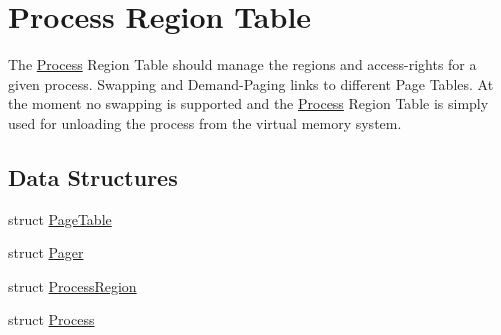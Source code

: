 \hypertarget{group___v_m_m___p_r_t}{
\section{Process Region Table}
\label{group___v_m_m___p_r_t}
}
The \hyperlink{struct_process}{Process} Region Table should manage the regions and access-rights for a given process. Swapping and Demand-Paging links to different Page Tables. At the moment no swapping is supported and the \hyperlink{struct_process}{Process} Region Table is simply used for unloading the process from the virtual memory system.  


\subsection*{Data Structures}
\begin{CompactItemize}
\item 
struct \hyperlink{struct_page_table}{PageTable}
\item 
struct \hyperlink{struct_pager}{Pager}
\item 
struct \hyperlink{struct_process_region}{ProcessRegion}
\item 
struct \hyperlink{struct_process}{Process}
\end{CompactItemize}
